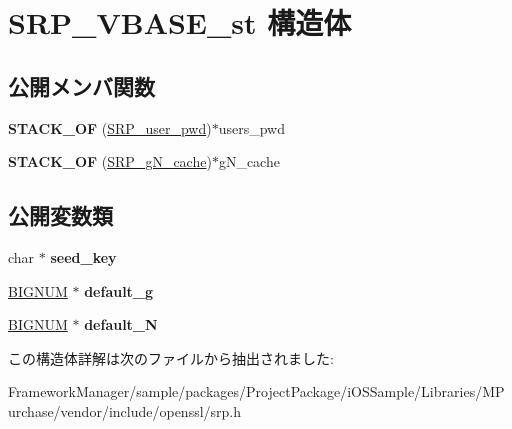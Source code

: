 \hypertarget{struct_s_r_p___v_b_a_s_e__st}{}\section{S\+R\+P\+\_\+\+V\+B\+A\+S\+E\+\_\+st 構造体}
\label{struct_s_r_p___v_b_a_s_e__st}
\subsection*{公開メンバ関数}
\begin{DoxyCompactItemize}
\item 
\hypertarget{struct_s_r_p___v_b_a_s_e__st_ab020d88c3b4b62a4372da01516d7c881}{}{\bfseries S\+T\+A\+C\+K\+\_\+\+O\+F} (\hyperlink{struct_s_r_p__user__pwd__st}{S\+R\+P\+\_\+user\+\_\+pwd})$\ast$users\+\_\+pwd\label{struct_s_r_p___v_b_a_s_e__st_ab020d88c3b4b62a4372da01516d7c881}

\item 
\hypertarget{struct_s_r_p___v_b_a_s_e__st_a2dc0113172f9724f652affcefe3b82b8}{}{\bfseries S\+T\+A\+C\+K\+\_\+\+O\+F} (\hyperlink{struct_s_r_p__g_n__cache__st}{S\+R\+P\+\_\+g\+N\+\_\+cache})$\ast$g\+N\+\_\+cache\label{struct_s_r_p___v_b_a_s_e__st_a2dc0113172f9724f652affcefe3b82b8}

\end{DoxyCompactItemize}
\subsection*{公開変数類}
\begin{DoxyCompactItemize}
\item 
\hypertarget{struct_s_r_p___v_b_a_s_e__st_a9f8612fe073f8d7bc07c1177c3069a66}{}char $\ast$ {\bfseries seed\+\_\+key}\label{struct_s_r_p___v_b_a_s_e__st_a9f8612fe073f8d7bc07c1177c3069a66}

\item 
\hypertarget{struct_s_r_p___v_b_a_s_e__st_ad5245233a409421484ed56f3e6eba454}{}\hyperlink{structbignum__st}{B\+I\+G\+N\+U\+M} $\ast$ {\bfseries default\+\_\+g}\label{struct_s_r_p___v_b_a_s_e__st_ad5245233a409421484ed56f3e6eba454}

\item 
\hypertarget{struct_s_r_p___v_b_a_s_e__st_a5b98cadde5a5d7c0b32f5ce9596dca87}{}\hyperlink{structbignum__st}{B\+I\+G\+N\+U\+M} $\ast$ {\bfseries default\+\_\+\+N}\label{struct_s_r_p___v_b_a_s_e__st_a5b98cadde5a5d7c0b32f5ce9596dca87}

\end{DoxyCompactItemize}


この構造体詳解は次のファイルから抽出されました\+:\begin{DoxyCompactItemize}
\item 
Framework\+Manager/sample/packages/\+Project\+Package/i\+O\+S\+Sample/\+Libraries/\+M\+Purchase/vendor/include/openssl/srp.\+h\end{DoxyCompactItemize}

